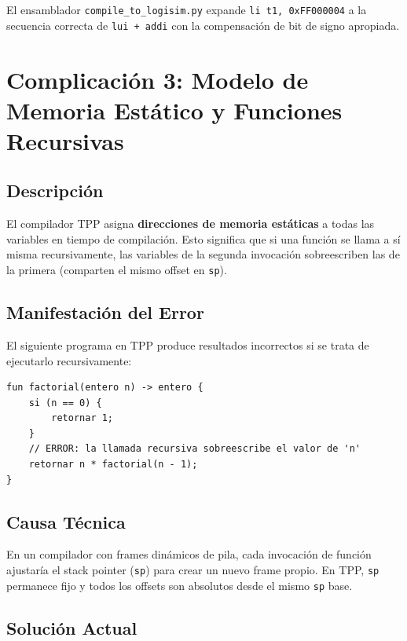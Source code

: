 El ensamblador \texttt{compile\_to\_logisim.py} expande \texttt{li t1, 0xFF000004} a la secuencia correcta de \texttt{lui + addi} con la compensación de bit de signo apropiada.

\section{Complicación 3: Modelo de Memoria Estático y Funciones Recursivas}

\subsection{Descripción}

El compilador TPP asigna \textbf{direcciones de memoria estáticas} a todas las variables en tiempo de compilación. Esto significa que si una función se llama a sí misma recursivamente, las variables de la segunda invocación sobreescriben las de la primera (comparten el mismo offset en \texttt{sp}).

\subsection{Manifestación del Error}

El siguiente programa en TPP produce resultados incorrectos si se trata de ejecutarlo recursivamente:

\begin{lstlisting}[style=tppstyle, caption={Intento de recursión en TPP (resultado incorrecto)}]
fun factorial(entero n) -> entero {
    si (n == 0) {
        retornar 1;
    }
    // ERROR: la llamada recursiva sobreescribe el valor de 'n'
    retornar n * factorial(n - 1);
}
\end{lstlisting}

\subsection{Causa Técnica}

En un compilador con frames dinámicos de pila, cada invocación de función ajustaría el stack pointer (\texttt{sp}) para crear un nuevo frame propio. En TPP, \texttt{sp} permanece fijo y todos los offsets son absolutos desde el mismo \texttt{sp} base.

\subsection{Solución Actual}

